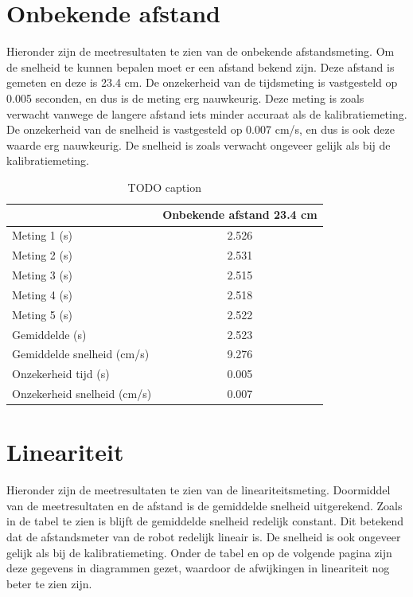 \documentclass{report}
\begin{document}
\section{Onbekende afstand}
Hieronder zijn de meetresultaten te zien van de onbekende afstandsmeting. Om de snelheid te kunnen bepalen moet er een afstand bekend zijn. Deze afstand is gemeten en deze is 23.4 cm. De onzekerheid van de tijdsmeting is vastgesteld op 0.005 seconden, en dus is de meting erg nauwkeurig. Deze meting is zoals verwacht vanwege de langere afstand iets minder accuraat als de kalibratiemeting. De onzekerheid van de snelheid is vastgesteld op 0.007 cm/s, en dus is ook deze waarde erg nauwkeurig. De snelheid is zoals verwacht ongeveer gelijk als bij de kalibratiemeting.

\begin{table}
 \centering
\begin{tabular}{| l| c|}
\hline
    & Onbekende afstand 23.4 cm\\
\hline
   Meting 1 (s) & 2.526 \\
\hline
   Meting 2 (s) & 2.531 \\
\hline
   Meting 3 (s) & 2.515 \\
\hline
   Meting 4 (s) & 2.518 \\
\hline
   Meting 5 (s) & 2.522 \\
\hline
   Gemiddelde (s) & 2.523 \\
\hline
   Gemiddelde snelheid (cm/s) & 9.276 \\
\hline
   Onzekerheid tijd (s) & 0.005 \\
\hline
   Onzekerheid snelheid (cm/s) & 0.007 \\
\hline
 \end{tabular}
\caption{TODO caption}
\end{table}

\section{Lineariteit}
Hieronder zijn de meetresultaten te zien van de lineariteitsmeting. Doormiddel van de meetresultaten en de afstand is de gemiddelde snelheid uitgerekend. Zoals in de tabel te zien is blijft de gemiddelde snelheid redelijk constant. Dit betekend dat de afstandsmeter van de robot redelijk lineair is. De snelheid is ook ongeveer gelijk als bij de kalibratiemeting. Onder de tabel en op de volgende pagina zijn deze gegevens in diagrammen gezet, waardoor de afwijkingen in lineariteit nog beter te zien zijn. 
\end{document}
